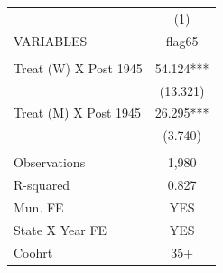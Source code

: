 \begin{tabular}{lc} \hline
 & (1) \\
VARIABLES & flag65 \\ \hline
 &  \\
Treat (W) X Post 1945 & 54.124*** \\
 & (13.321) \\
Treat (M) X Post 1945 & 26.295*** \\
 & (3.740) \\
 &  \\
Observations & 1,980 \\
R-squared & 0.827 \\
Mun. FE & YES \\
State X Year FE & YES \\
 Coohrt & 35+ \\ \hline
\end{tabular}
